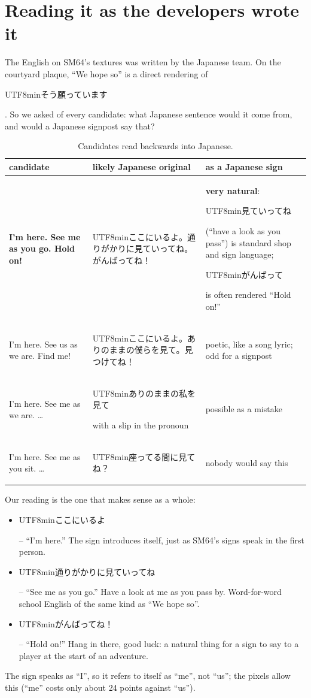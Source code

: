 \documentclass[10pt,a4paper]{article}
\newcommand{\jp}[1]{\begin{CJK}{UTF8}{min}#1\end{CJK}}
\newcommand{\q}[1]{``#1''}
\begin{document}
\section{Reading it as the developers wrote it}
\label{sec:japanese}
The English on SM64's textures was written by the Japanese team. On the courtyard plaque, \q{We hope so} is a direct
rendering of \jp{そう願っています}. So we asked of every candidate: what Japanese sentence would it come from, and would a
Japanese signpost say that?
\begin{table}[h]\centering\small
\begin{tabularx}{\linewidth}{p{4.0cm}p{4.3cm}X}\toprule
candidate & likely Japanese original & as a Japanese sign\\\midrule
\textbf{I'm here. See me as you go. Hold on!} & \jp{ここにいるよ。通りがかりに見ていってね。がんばってね！} & \textbf{very natural}:
\jp{見ていってね} (\q{have a look as you pass}) is standard shop and sign language; \jp{がんばって} is often rendered
\q{Hold on!}\\
I'm here. See us as we are. Find me! & \jp{ここにいるよ。ありのままの僕らを見て。見つけてね！} & poetic, like a song
lyric; odd for a signpost\\
I'm here. See me as we are. \ldots & \jp{ありのままの私を見て} with a slip in the pronoun & possible as a mistake\\
I'm here. See me as you sit. \ldots & \jp{座ってる間に見てね？} & nobody would say this\\
\bottomrule\end{tabularx}
\caption{Candidates read backwards into Japanese.}
\label{tab:japanese}
\end{table}

Our reading is the one that makes sense as a whole:
\begin{itemize}
\item \jp{ここにいるよ} -- \q{I'm here.} The sign introduces itself, just as SM64's signs speak in the first person.
\item \jp{通りがかりに見ていってね} -- \q{See me as you go.} Have a look at me as you pass by. Word-for-word school English
of the same kind as \q{We hope so}.
\item \jp{がんばってね！} -- \q{Hold on!} Hang in there, good luck: a natural thing for a sign to say to a player at the
start of an adventure.
\end{itemize}
The sign speaks as \q{I}, so it refers to itself as \q{me}, not \q{us}; the pixels allow this (\q{me} costs only about
24 points against \q{us}).
\end{document}
